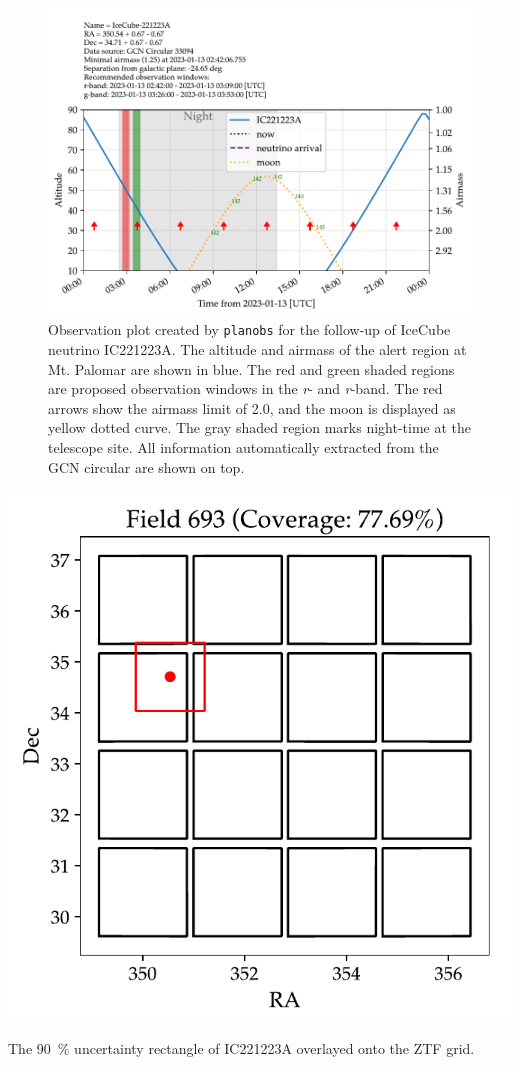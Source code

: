 \documentclass[
    a4paper, %
    fontsize=10pt, %
    twoside=true, %
    numbers=noenddot, %
    fontmethod=tex,
]{kaobook}
\begin{document}
\begin{figure}[h!]
    \includegraphics{fu/planobs_airmass.pdf}
    \caption[Observation plan]{Observation plot created by \texttt{planobs} for the follow-up of IceCube neutrino IC221223A. The altitude and airmass of the alert region at Mt. Palomar are shown in blue. The red and green shaded regions are proposed observation windows in the \textit{r}- and \textit{r}-band. The red arrows show the airmass limit of 2.0, and the moon is displayed as yellow dotted curve. The gray shaded region marks night-time at the telescope site. All information automatically extracted from the GCN circular are shown on top.}
\end{figure}
\begin{marginfigure}
    \includegraphics{fu/planobs_grid.pdf}
    \caption[\texttt{planobs} ZTF grid]{The \SI{90}{\percent} uncertainty rectangle of IC221223A overlayed onto the ZTF grid.}
\end{marginfigure}
\end{document}
